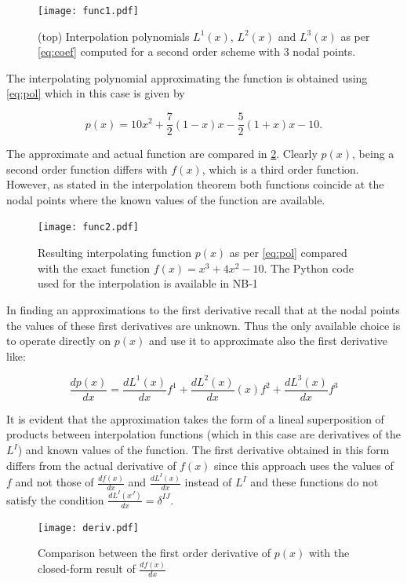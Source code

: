 \begin{figure}[H]
  \centering
  \texttt{[image: func1.pdf]}
  \caption{(top) Interpolation polynomials $L^1(x)$, $L^2(x)$ and $L^3(x)$ as per \cref{eq:coef} computed for a second order scheme with 3 nodal points.}
  \label{fig:pols}
\end{figure}

The interpolating polynomial approximating the function is obtained using \cref{eq:pol} which in this case is given by


\[p(x) = 10{x^2} + \frac{7}{2}(1 - x)x - \frac{5}{2}(1 + x)x - 10.\]

The approximate and actual function are compared in \cref{fig:functions}. Clearly $p(x)$, being a second order function differs with $f(x)$, which is a third order function. However, as stated in the interpolation theorem both functions coincide at the nodal points where the known values of the function are available.


\begin{figure}[H]
  \centering
  \texttt{[image: func2.pdf]}
  \caption{Resulting interpolating function $p(x)$ as per \cref{eq:pol} compared with the exact function $f(x) = {x^3} + 4{x^2} - 10$. The Python code used for the interpolation is available in NB-1}
  \label{fig:functions}
\end{figure}


In finding an approximations to the first derivative recall that at the nodal points the values of these first derivatives are unknown. Thus the only available choice is to operate directly on $p(x)$ and use it to approximate also the first derivative like:


\begin{equation}\label{eq:der}
  \frac{ dp(x)}{dx} = \frac{dL^1(x)}{dx} f^1 + \frac{dL^2(x)}{dx}(x) f^2 + \frac{dL^3(x)}{dx} f^3
\end{equation}

It is evident that the approximation takes the form of a lineal superposition of products between interpolation functions (which in this case are derivatives of the $L^I$) and known values of the function. The first derivative obtained in this form differs from the actual derivative of $f(x)$ since this approach uses the values of $f$ and not those of $\frac{{df(x)}}{{dx}}$ and $\frac{dL^I(x)}{dx}$ instead of $L^I$ and these functions do not satisfy the condition $\frac{dL^I(x^J)}{dx} = \delta ^{IJ}$.


\begin{figure}[H]
  \centering
  \texttt{[image: deriv.pdf]}
  \caption{Comparison between the first order derivative of $p(x)$ with the closed-form result of $\frac{{df(x)}}{{dx}}$}
  \label{fig:deriv}
\end{figure}


